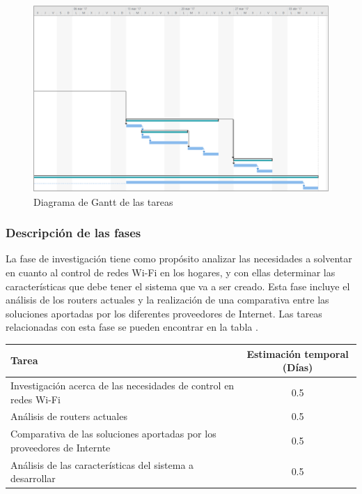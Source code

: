 \documentclass[12pt]{article}
\begin{document}
        \begin{figure}[h!]
            \centering
                \includegraphics[scale=0.5]{tasks_gantt1.eps}
                \caption{Diagrama de Gantt de las tareas}
                \label{fig:tasks_gantt1}
        \end{figure}

        \clearpage

        \subsubsection{Descripción de las fases}
            La fase de investigación tiene como propósito analizar las necesidades a solventar en cuanto al control de redes Wi-Fi en los hogares, y con ellas determinar las características que debe tener el sistema que va a ser creado. Esta fase incluye el análisis de los routers actuales y la realización de una comparativa entre las soluciones aportadas por los diferentes proveedores de Internet. Las tareas relacionadas con esta fase se pueden encontrar en la tabla .

            \begin{tabular}{|l|c|}
                \hline
                \textbf{Tarea}                                                              &   \textbf{Estimación temporal} (Días) \\           
                \hline
                Investigación acerca de las necesidades de control en redes Wi-Fi           &   0.5                                 \\
                Análisis de routers actuales                                                &   0.5                                 \\
                Comparativa de las soluciones aportadas por los proveedores de Internte     &   0.5                                 \\
                Análisis de las características del sistema a desarrollar                   &   0.5                                 \\
                \hline
            \end{tabular}
\end{document}
